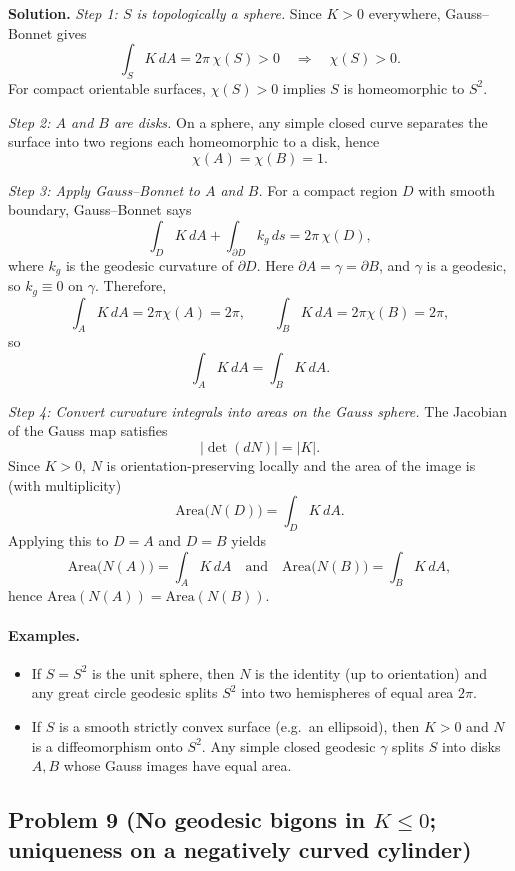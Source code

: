 \documentclass[12pt,a4paper]{article}
\theoremstyle{plain}
\theoremstyle{definition}      %
\begin{document}
	\textbf{Solution.}
	\textit{Step 1: $S$ is topologically a sphere.}
	Since $K>0$ everywhere, Gauss--Bonnet gives
	\[
	\int_S K\,dA = 2\pi\,\chi(S) > 0 \quad\Rightarrow\quad \chi(S)>0.
	\]
	For compact orientable surfaces, $\chi(S)>0$ implies $S$ is homeomorphic to $S^2$.
	
	\textit{Step 2: $A$ and $B$ are disks.}
	On a sphere, any simple closed curve separates the surface into two regions each homeomorphic to a disk, hence
	\[
	\chi(A)=\chi(B)=1.
	\]
	
	\textit{Step 3: Apply Gauss--Bonnet to $A$ and $B$.}
	For a compact region $D$ with smooth boundary, Gauss--Bonnet says
	\[
	\int_D K\,dA + \int_{\partial D} k_g\,ds = 2\pi\,\chi(D),
	\]
	where $k_g$ is the geodesic curvature of $\partial D$.
	Here $\partial A=\gamma=\partial B$, and $\gamma$ is a geodesic, so $k_g\equiv 0$ on $\gamma$.
	Therefore,
	\[
	\int_A K\,dA = 2\pi\chi(A)=2\pi,
	\qquad
	\int_B K\,dA = 2\pi\chi(B)=2\pi,
	\]
	so
	\[
	\int_A K\,dA = \int_B K\,dA.
	\]
	
	\textit{Step 4: Convert curvature integrals into areas on the Gauss sphere.}
	The Jacobian of the Gauss map satisfies
	\[
	\bigl|\det(dN)\bigr| = |K|.
	\]
	Since $K>0$, $N$ is orientation-preserving locally and the area of the image is (with multiplicity)
	\[
	\mathrm{Area}\bigl(N(D)\bigr)=\int_D K\,dA.
	\]
	Applying this to $D=A$ and $D=B$ yields
	\[
	\mathrm{Area}\bigl(N(A)\bigr)=\int_A K\,dA
	\quad\text{and}\quad
	\mathrm{Area}\bigl(N(B)\bigr)=\int_B K\,dA,
	\]
	hence $\mathrm{Area}(N(A))=\mathrm{Area}(N(B))$.
	
	\paragraph{Examples.}
	\begin{itemize}
		\item If $S=S^2$ is the unit sphere, then $N$ is the identity (up to orientation) and any great circle geodesic
		splits $S^2$ into two hemispheres of equal area $2\pi$.
		\item If $S$ is a smooth strictly convex surface (e.g.\ an ellipsoid), then $K>0$ and $N$ is a diffeomorphism onto $S^2$.
		Any simple closed geodesic $\gamma$ splits $S$ into disks $A,B$ whose Gauss images have equal area.
	\end{itemize}
	
	
	
	\subsection*{Problem 9 (No geodesic bigons in $K\le 0$; uniqueness on a negatively curved cylinder)}
	
\end{document}
